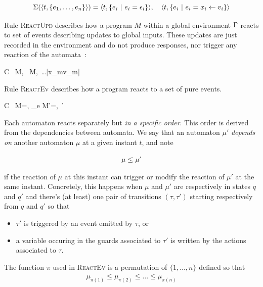 \begin{equation*}
  \Sigma(\langle t, \{e_1,\ldots,e_n\}\rangle) = \langle t, \{ e_i ~|~ e_i = \epsilon_i \}\rangle,\quad\langle t, \{
        e_i ~|~ e_i = x_i \gets v_i \}\rangle
\end{equation*}

\step Rule \textsc{ReactUpd} describes how a program $M$ within a global environment $\Gamma$ reacts to set
of events describing updates to global inputs. These updates are just recorded in the environment and do not produce
responses, nor trigger any reaction of the automata~:

\infrule[ReactUpd]
{}
{C \vdash\ M,\ \env {} M,\ \env[x_1\mapsto
  v_1]\ldots[x_m\mapsto v_m]}

\step
Rule \textsc{ReactEv} describes how a program reacts to a set of pure events.

{C \vdash\ M=\setn{\mu}, \env {}_e
  M'=,\ \env'}

Each automaton reacts
separately but \emph{in a specific order}. This order is derived from the dependencies between
automata. We say that an automaton $\mu'$ \emph{depends on} another automaton $\mu$ at a given
instant $t$, and note

\begin{eqnarray*}
  \mu \leq \mu'
\end{eqnarray*}

if the reaction of $\mu$ at this instant can trigger or modify the reaction of $\mu'$
at the same instant. Concretely, this happens when $\mu$ and $\mu'$ are respectively in states $q$
and $q'$ and there's (at least) one pair of transitions $(\tau,\tau')$ starting respectively from
$q$ and $q'$ so that
\begin{itemize}
\item $\tau'$ is triggered by an event emitted by $\tau$, or
\item a variable occuring in the guards associated to $\tau'$ is written by the actions associated
  to $\tau$.
\end{itemize}

The function $\pi$ used in \textsc{ReactEv} is a permutation of $\{1,\ldots,n\}$ defined so that
\begin{eqnarray*}
  \mu_{\pi(1)} \leq \mu_{\pi(2)} \leq \ldots \leq \mu_{\pi(n)}
\end{eqnarray*}

